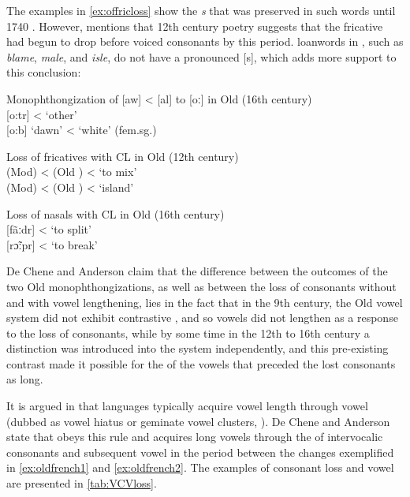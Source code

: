 \documentclass[output=paper,
modfonts
]{LSP/langsci}
\begin{document}
The examples in \cref{ex:offricloss} show the  \emph{s} that was preserved
in such words until 1740 \citep[520]{deChene1979}. However,
\citet[151]{pope1934} mentions that 12th century poetry suggests that the
fricative had begun to drop before voiced consonants by this period.
 loanwords in , such as \emph{blame}, \emph{male}, and
\emph{isle}, do not have a pronounced {[}s{]}, which adds more support
to this conclusion:

\ea\label{ex:oldfrench2}
	\ea\label{ex:monoalawo}Monophthongization of {[}aw{]} \textless{} {[}al{]} to {[}oː{]} in Old  (16th century)\\
	 {[}o:tr{]} \textless{}  `other'\\
	 {[}o:b{]} `dawn' \textless{}  `white' (fem.sg.)
	
	\ex\label{ex:offricloss}Loss of fricatives with CL in Old  (12th century)\\
	 (Mod) \textless{}  (Old ) \textless{}  `to mix'\\
	 (Mod) \textless{}  (Old ) \textless{}  `island'
	
	\ex\label{ex:ofnasloss}Loss of nasals with CL in Old  (16th century)\\
	 {[}fãːdr{]} \textless{}  `to split'\\
	 {[}rɔ̃ːpr{]} \textless{}  `to break'
	\z
\z

De Chene and Anderson claim that the difference between the outcomes of
the two Old  monophthongizations, as well as between the loss of
consonants without and with vowel lengthening, lies in the fact that in
the 9th century, the Old  vowel system did not
exhibit contrastive , and so vowels did not lengthen as a
response to the loss of consonants, while by some time in the
12th to 16th century a 
distinction was introduced into the system independently, and this
pre-existing  contrast made it possible for the 
of the vowels that preceded the lost consonants as long.

It is argued in \citet{deChene1985} that languages typically acquire vowel
length through vowel  (dubbed as vowel hiatus or geminate
vowel clusters, \citealt[520]{deChene1979}). De Chene and
Anderson \citeyearpar{deChene1979} state that  obeys this rule and acquires long
vowels through the  of intervocalic consonants and subsequent
vowel  in the period between the changes exemplified in \cref{ex:oldfrench1}
and \cref{ex:oldfrench2}. The examples of consonant loss and vowel  are
presented in \cref{tab:VCVloss}.
\end{document}
